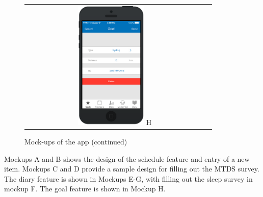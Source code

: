 \documentclass[a4paper, 11pt, titlepage]{article}
\begin{document}
\begin{figure}[H]
\begin{tabular}{cc}
		\includegraphics[width=0.38\textwidth]{figures/mockups/goal-1.png} H
	\end{tabular}

	\caption{Mock-ups of the app (continued)}
	\label{fig:mockups-2}
\end{figure}

Mockups A and B shows the design of the schedule feature and entry of a new item. Mockups C and D provide a sample design for filling out the MTDS survey. The diary feature is shown in Mockups E-G, with filling out the sleep survey in mockup F. The goal feature is shown in Mockup H.

\pagebreak
\end{document}
